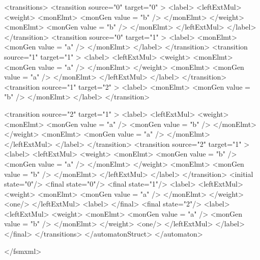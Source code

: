 \newpage 

{\footnotesize 
\begin{listingcont}
    <transitions>
      <transition  source="0"  target="0" >
        <label>
          <leftExtMul>
            <weight>
	      <monElmt>
		<monGen  value = "b" />
	      </monElmt>
            </weight>
            <monElmt>
              <monGen  value = "b" />
            </monElmt>
          </leftExtMul>
        </label>
      </transition>
      <transition  source="0"  target="1" >
        <label>
	  <monElmt>
	    <monGen  value = "a" />
	  </monElmt>
        </label>
      </transition>
      <transition  source="1"  target="1" >
        <label>
          <leftExtMul>
            <weight>
	      <monElmt>
		<monGen  value = "a" />
	      </monElmt>
            </weight>
            <monElmt>
              <monGen  value = "a" />
            </monElmt>
          </leftExtMul>
        </label>
      </transition>
      <transition  source="1"  target="2" >
        <label>
          <monElmt>
            <monGen  value = "b" />
          </monElmt>
        </label>
      </transition>
\end{listingcont}
}

\newpage 
\enlargethispage*{2ex}
{\footnotesize 
\begin{listingcont}
      <transition  source="2"  target="1" >
        <label>
          <leftExtMul>
            <weight>
	      <monElmt>
		<monGen  value = "a" />
		<monGen  value = "b" />
	      </monElmt>
            </weight>
            <monElmt>
              <monGen  value = "a" />
            </monElmt>
          </leftExtMul>
        </label>
      </transition>
      <transition  source="2"  target="1" >
        <label>
          <leftExtMul>
            <weight>
	      <monElmt>
		<monGen  value = "b" />
		<monGen  value = "a" />
	      </monElmt>
            </weight>
            <monElmt>
              <monGen  value = "b" />
            </monElmt>
          </leftExtMul>
        </label>
      </transition>
      <initial state="0"/>
      <final   state="0"/>
      <final   state="1"/>
	<label>
	  <leftExtMul>
	    <weight>
	      <monElmt>
		<monGen  value = "a" />
	      </monElmt>
	    </weight>
	    <one/>
	  </leftExtMul>
	<label>
      </final>
      <final   state="2"/>
	<label>
	  <leftExtMul>
	    <weight>
	      <monElmt>
		<monGen  value = "a" />
		<monGen  value = "b" />
	      </monElmt>
	    </weight>
	    <one/>
	  </leftExtMul>
	</label>
      </final>
    </transitions>
  </automatonStruct>
</automaton>

</fsmxml>
\end{listingcont}
}

\clearpage
